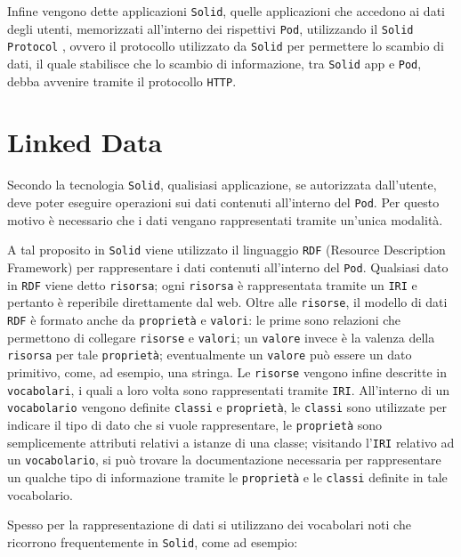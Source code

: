 \medskip

Infine vengono dette applicazioni {\tt Solid}, quelle applicazioni che accedono ai dati degli utenti, memorizzati all'interno dei rispettivi {\tt Pod}, utilizzando il {\tt Solid Protocol}
\cite{solidprotocol}, ovvero il protocollo utilizzato da {\tt Solid} per permettere lo scambio di dati, il quale stabilisce che lo scambio di informazione, tra {\tt Solid} app e {\tt Pod}, debba avvenire tramite il protocollo {\tt HTTP}.

\bigskip

\section{Linked Data}

\medskip

Secondo la tecnologia {\tt Solid}, qualisiasi applicazione, se autorizzata dall'utente, deve poter eseguire operazioni sui dati contenuti all'interno del {\tt Pod}. Per questo motivo è necessario che i dati vengano rappresentati tramite un'unica modalità.

\medskip

A tal proposito in {\tt Solid} viene utilizzato il linguaggio {\tt RDF} (Resource Description Framework) per rappresentare i dati contenuti all'interno del {\tt Pod}. Qualsiasi dato in {\tt RDF} viene detto {\tt risorsa}; ogni {\tt risorsa} è rappresentata tramite un {\tt IRI} e pertanto è reperibile direttamente dal web. Oltre alle {\tt risorse}, il modello di dati {\tt RDF} è formato anche da {\tt proprietà} e {\tt valori}: le prime sono relazioni che permettono di collegare {\tt risorse} e {\tt valori}; un {\tt valore} invece è la valenza della {\tt risorsa} per tale {\tt proprietà}; eventualmente un {\tt valore} può essere un dato primitivo, come, ad esempio, una stringa. Le {\tt risorse} vengono infine descritte in {\tt vocabolari}, i quali a loro volta sono rappresentati tramite {\tt IRI}. All'interno di un {\tt vocabolario} vengono definite {\tt classi} e {\tt proprietà}, le {\tt classi} sono utilizzate per indicare il tipo di dato che si vuole rappresentare, le {\tt proprietà} sono semplicemente attributi relativi a istanze di una classe; visitando l'{\tt IRI} relativo ad un {\tt vocabolario}, si può trovare la documentazione necessaria per rappresentare un qualche tipo di informazione tramite le {\tt proprietà} e le {\tt classi} definite in tale vocabolario.

\medskip

Spesso per la rappresentazione di dati si utilizzano dei vocabolari noti che ricorrono frequentemente in {\tt Solid}, come ad esempio:

